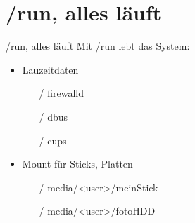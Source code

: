 \section[/run]{/run, alles läuft}
\begin{frame}{/run, alles läuft}
Mit /run lebt das System:
\begin{itemize}
 \item Lauzeitdaten
  \begin{itemize}
   \item [/] firewalld
   \item [/] dbus
   \item [/] cups
  \end{itemize}
 \item Mount für Sticks, Platten
 
  \begin{itemize}
   \item [/] media/<user>/meinStick
   \item [/] media/<user>/fotoHDD
  \end{itemize}

\end{itemize}


 
\end{frame}

